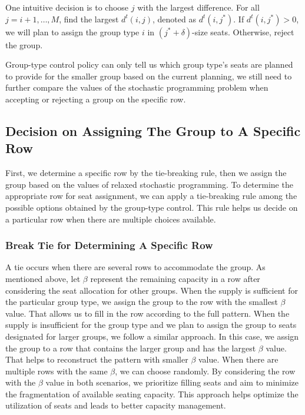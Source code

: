 One intuitive decision is to choose $j$ with the largest difference. For all $j = i+1, \ldots, M$, find the largest $d^{t}(i,j)$, denoted as $d^{t}(i,j^{*})$. If $d^{t}(i,j^{*}) >0$, we will plan to assign the group type $i$ in $(j^{*}+\delta)$-size seats. Otherwise, reject the group.

Group-type control policy can only tell us which group type's seats are planned to provide for the smaller group based on the current planning, we still need to further compare the values of the stochastic programming problem when accepting or rejecting a group on the specific row. 

\subsection{Decision on Assigning The Group to A Specific Row}
First, we determine a specific row by the tie-breaking rule, then we assign the group based on the values of relaxed stochastic programming. To determine the appropriate row for seat assignment, we can apply a tie-breaking rule among the possible options obtained by the group-type control. This rule helps us decide on a particular row when there are multiple choices available. 

\subsubsection*{Break Tie for Determining A Specific Row}
A tie occurs when there are several rows to accommodate the group. As mentioned above, let $\beta$ represent the remaining capacity in a row after considering the seat allocation for other groups.
When the supply is sufficient for the particular group type, we assign the group to the row with the smallest $\beta$ value. That allows us to fill in the row according to the full pattern. When the supply is insufficient for the group type and we plan to assign the group to seats designated for larger groups, we follow a similar approach. In this case, we assign the group to a row that contains the larger group and has the largest $\beta$ value. That helps to reconstruct the pattern with smaller $\beta$ value. When there are multiple rows with the same $\beta$, we can choose randomly. By considering the row with the $\beta$ value in both scenarios, we prioritize filling seats and aim to minimize the fragmentation of available seating capacity. This approach helps optimize the utilization of seats and leads to better capacity management.

